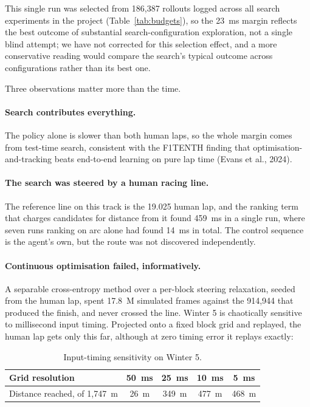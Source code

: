 \documentclass[11pt]{article}
\begin{document}
This single run was selected from 186,387 rollouts logged across all search experiments in the project (Table~\ref{tab:budgets}), so the 23~ms margin reflects the best outcome of substantial search-configuration exploration, not a single blind attempt; we have not corrected for this selection effect, and a more conservative reading would compare the search's typical outcome across configurations rather than its best one.

Three observations matter more than the time.

\paragraph{Search contributes everything.} The policy alone is slower than both human laps, so the whole margin comes from test-time search, consistent with the F1TENTH finding that optimisation-and-tracking beats end-to-end learning on pure lap time (Evans et al., 2024).

\paragraph{The search was steered by a human racing line.} The reference line on this track is the 19.025 human lap, and the ranking term that charges candidates for distance from it found 459~ms in a single run, where seven runs ranking on arc alone had found 14~ms in total. The control sequence is the agent's own, but the route was not discovered independently.

\paragraph{Continuous optimisation failed, informatively.} A separable cross-entropy method over a per-block steering relaxation, seeded from the human lap, spent 17.8~M simulated frames against the 914,944 that produced the finish, and never crossed the line. Winter 5 is chaotically sensitive to millisecond input timing. Projected onto a fixed block grid and replayed, the human lap gets only this far, although at zero timing error it replays exactly:

\begin{table}[h]
\centering
\begin{tabular}{@{}lcccc@{}}
\toprule
\textbf{Grid resolution} & \textbf{50~ms} & \textbf{25~ms} & \textbf{10~ms} & \textbf{5~ms} \\
\midrule
Distance reached, of 1,747~m & 26~m & 349~m & 477~m & 468~m \\
\bottomrule
\end{tabular}
\caption{Input-timing sensitivity on Winter 5.}
\label{tab:timing}
\end{table}
\end{document}
